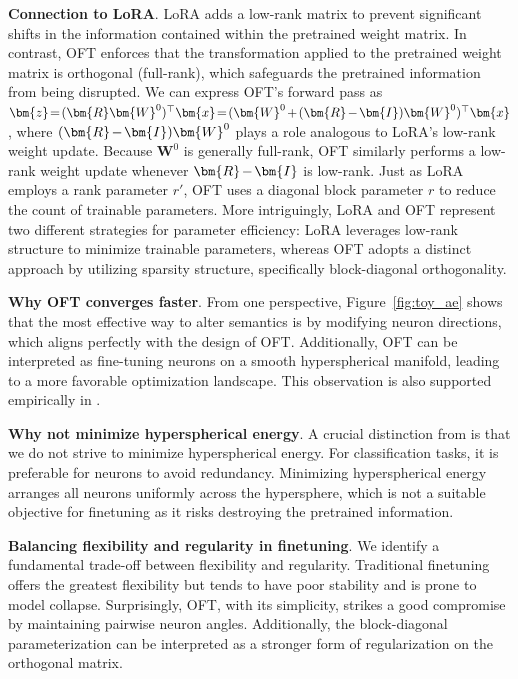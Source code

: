 \textbf{Connection to LoRA}. LoRA adds a low-rank matrix to prevent significant shifts in the information contained within the pretrained weight matrix. In contrast, OFT enforces that the transformation applied to the pretrained weight matrix is orthogonal (full-rank), which safeguards the pretrained information from being disrupted. We can express OFT's forward pass as $\thickmuskip=2mu \medmuskip=2mu \bm{z}=(\bm{R}\bm{W}^0)^\top\bm{x}=(\bm{W}^0+(\bm{R}-\bm{I})\bm{W}^0)^\top\bm{x}$, where $\thickmuskip=2mu \medmuskip=2mu (\bm{R}-\bm{I})\bm{W}^0$ plays a role analogous to LoRA's low-rank weight update. Because $\bm{W}^0$ is generally full-rank, OFT similarly performs a low-rank weight update whenever $\thickmuskip=2mu \medmuskip=2mu \bm{R}-\bm{I}$ is low-rank. Just as LoRA employs a rank parameter $r'$, OFT uses a diagonal block parameter $r$ to reduce the count of trainable parameters. More intriguingly, LoRA and OFT represent two different strategies for parameter efficiency: LoRA leverages low-rank structure to minimize trainable parameters, whereas OFT adopts a distinct approach by utilizing sparsity structure, specifically block-diagonal orthogonality.

\textbf{Why OFT converges faster}. From one perspective, Figure~\ref{fig:toy_ae} shows that the most effective way to alter semantics is by modifying neuron directions, which aligns perfectly with the design of OFT. Additionally, OFT can be interpreted as fine-tuning neurons on a smooth hyperspherical manifold, leading to a more favorable optimization landscape. This observation is also supported empirically in \cite{liu2021orthogonal}.

\textbf{Why not minimize hyperspherical energy}. A crucial distinction from \cite{liu2021orthogonal} is that we do not strive to minimize hyperspherical energy. For classification tasks, it is preferable for neurons to avoid redundancy. Minimizing hyperspherical energy arranges all neurons uniformly across the hypersphere, which is not a suitable objective for finetuning as it risks destroying the pretrained information.

\textbf{Balancing flexibility and regularity in finetuning}. We identify a fundamental trade-off between flexibility and regularity. Traditional finetuning offers the greatest flexibility but tends to have poor stability and is prone to model collapse. Surprisingly, OFT, with its simplicity, strikes a good compromise by maintaining pairwise neuron angles. Additionally, the block-diagonal parameterization can be interpreted as a stronger form of regularization on the orthogonal matrix.

